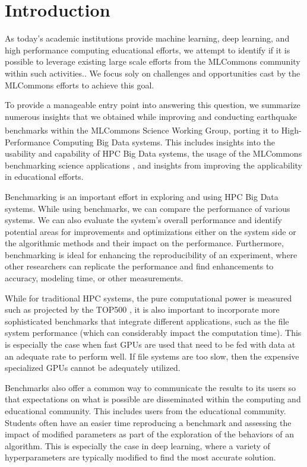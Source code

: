 \documentclass[utf8]{FrontiersinVancouver} %
\begin{document}
\section{Introduction}


As today's academic institutions provide machine learning, deep learning, and high performance computing educational efforts, we attempt to identify if it is possible to leverage 
existing large scale efforts from the MLCommons community within such activities.\cite{www-mlcommons,las-22-mlcommons-science}. We focus soly on challenges and opportunities cast by the MLCommons efforts to achieve this goal.

To provide a manageable entry point into answering this question, we summarize numerous insights that we obtained while improving and conducting earthquake benchmarks within the MLCommons\textsuperscript{\texttrademark} Science Working Group, porting it to High-Performance Computing Big Data systems.  This includes insights into the usability and capability of HPC Big Data systems, the usage of the MLCommons benchmarking science applications \citep{las-22-mlcommons-science}, and insights from improving the applicability in educational efforts.

Benchmarking is an important effort in exploring and using HPC Big Data systems.  While using benchmarks, we can compare the performance of various systems. We can also evaluate the system's overall performance and identify potential areas for improvements and optimizations either on the system side or the algorithmic methods and their impact on the performance. Furthermore, benchmarking is ideal for enhancing the reproducibility of an experiment, where other researchers can replicate the performance and find enhancements to accuracy, modeling time, or other measurements.

While for traditional HPC systems, the pure computational power is measured such as projected by the TOP500 \cite{dongarra1997top500,www-top500}, it is also important to incorporate more sophisticated benchmarks that integrate different applications, such as the file system performance (which can considerably impact the computation time). This is especially the case when fast GPUs are used that need to be fed with data at an adequate rate to perform well. If file systems are too slow, then the expensive specialized GPUs cannot be adequately utilized.

Benchmarks also offer a common way to communicate the results to its users so that expectations on what is possible are disseminated within the computing and educational community. This includes users from the educational community. Students often have an easier time reproducing a benchmark and assessing the impact of modified parameters as part of the exploration of the behaviors of an algorithm. This is especially the case in deep learning, where a variety of hyperparameters are typically modified to find the most accurate solution.
\end{document}

